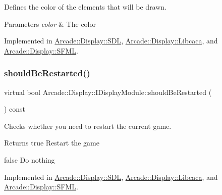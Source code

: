 Defines the color of the elements that will be drawn. 


\begin{DoxyParams}{Parameters}
{\em color} & The color \\
\hline
\end{DoxyParams}


Implemented in \mbox{\hyperlink{classArcade_1_1Display_1_1SDL_a857d2a5ab8266a1e11f528f398e3f55d}{Arcade\+::\+Display\+::\+S\+DL}}, \mbox{\hyperlink{classArcade_1_1Display_1_1Libcaca_ab79d34610f9dcfb503122ea6ad3fa97c}{Arcade\+::\+Display\+::\+Libcaca}}, and \mbox{\hyperlink{classArcade_1_1Display_1_1SFML_aee515eb3ff41dc4f23a0115d2bc4f4a7}{Arcade\+::\+Display\+::\+S\+F\+ML}}.

\mbox{\label{classArcade_1_1Display_1_1IDisplayModule_adc5d499229aa5899bbd4bae14f00cb27}} 
\subsubsection{\texorpdfstring{shouldBeRestarted()}{shouldBeRestarted()}}
{\footnotesize\ttfamily virtual bool Arcade\+::\+Display\+::\+I\+Display\+Module\+::should\+Be\+Restarted (\begin{DoxyParamCaption}{ }\end{DoxyParamCaption}) const\hspace{0.3cm}{\ttfamily [pure virtual]}}



Checks whether you need to restart the current game. 

\begin{DoxyReturn}{Returns}
true Restart the game 

false Do nothing 
\end{DoxyReturn}


Implemented in \mbox{\hyperlink{classArcade_1_1Display_1_1SDL_aaeeb1aa505c0eab3c8b5c34265c89845}{Arcade\+::\+Display\+::\+S\+DL}}, \mbox{\hyperlink{classArcade_1_1Display_1_1Libcaca_acccbe7d671cc860dded39937073d2298}{Arcade\+::\+Display\+::\+Libcaca}}, and \mbox{\hyperlink{classArcade_1_1Display_1_1SFML_a7c276ccbf48700092eb637d73b78e0d1}{Arcade\+::\+Display\+::\+S\+F\+ML}}.

\mbox{\label{classArcade_1_1Display_1_1IDisplayModule_a550877fb92d58325404b9ebe9e71f6ff}} 
